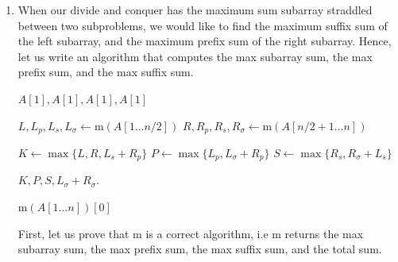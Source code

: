 \documentclass[12pt]{article}
\begin{document}
\begin{enumerate}
    In either case, we return the correct peak $A[k],$ meaning our
    algorithm is correct for input size $n.$

    $\therefore$ by strong induction, our algorithm is correct for
    all input sizes $n \geq 1.$

    This satisfies recurrence $T(n) = T(n/2) + \mathcal O(1),$
    meaning we have an asymptotic complexity via the Master theorem
    of $\mathcal O(\lg n).$

    \newpage

  \item When our divide and conquer has the maximum sum subarray
    straddled between two subproblems, we would like to find the
    maximum suffix sum of the left subarray, and the maximum prefix
    sum of the right subarray. Hence, let us write an algorithm that
    computes the max subarray sum, the max prefix sum, and the max suffix sum.

    \begin{algorithm}
      \caption{Max Sum}
      \begin{algorithmic}
        \State \Return $A[1], A[1], A[1], A[1]$
        \EndIf

        \State $L, L_p, L_s, L_\sigma \gets \text{m}(A[1 \ldots n/2])$
        \State $R, R_p, R_s, R_\sigma \gets \text{m}(A[ n/2 + 1 \ldots n])$

        \vspace{5mm}

        \State $K \gets \max\{L, R, L_s + R_p\}$
        \State $P \gets \max\{L_p, L_\sigma + R_p\}$
        \State $S \gets \max\{R_s, R_\sigma + L_s\}$

        \vspace{5mm}

        \State \Return $K, P, S, L_\sigma + R_\sigma.$
        \EndProcedure
      \end{algorithmic}

      \begin{algorithmic}
        \State \Return $\text{m}(A[1 \ldots n])[0]$
        \EndProcedure
      \end{algorithmic}
    \end{algorithm}

    First, let us prove that m is a correct algorithm, i.e m returns
    the max subarray sum, the max prefix sum, the max suffix sum, and
    the total sum.


\end{enumerate}
\end{document}
